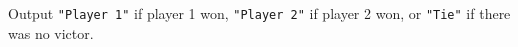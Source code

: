 
Output \texttt{"Player 1"} if player 1 won, \texttt{"Player 2"} if player 2 won, or \texttt{"Tie"} if there was no victor.

